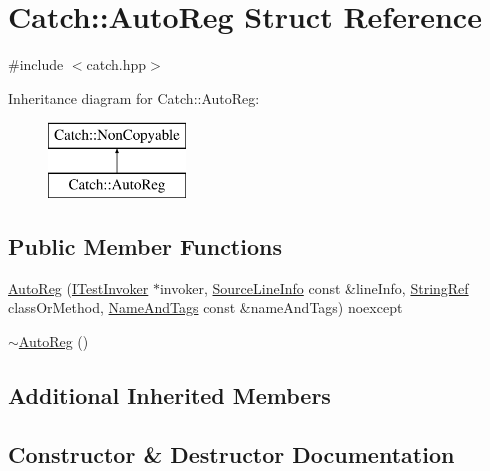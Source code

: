 \hypertarget{structCatch_1_1AutoReg}{}\section{Catch\+:\+:Auto\+Reg Struct Reference}
\label{structCatch_1_1AutoReg}


{\ttfamily \#include $<$catch.\+hpp$>$}

Inheritance diagram for Catch\+:\+:Auto\+Reg\+:\begin{figure}[H]
\begin{center}
\leavevmode
\includegraphics[height=2.000000cm]{structCatch_1_1AutoReg}
\end{center}
\end{figure}
\subsection*{Public Member Functions}
\begin{DoxyCompactItemize}
\item 
\mbox{\hyperlink{structCatch_1_1AutoReg_a67eef1fbd8f281ae09c6ccecddc34aa7}{Auto\+Reg}} (\mbox{\hyperlink{structCatch_1_1ITestInvoker}{I\+Test\+Invoker}} $\ast$invoker, \mbox{\hyperlink{structCatch_1_1SourceLineInfo}{Source\+Line\+Info}} const \&line\+Info, \mbox{\hyperlink{classCatch_1_1StringRef}{String\+Ref}} class\+Or\+Method, \mbox{\hyperlink{structCatch_1_1NameAndTags}{Name\+And\+Tags}} const \&name\+And\+Tags) noexcept
\item 
\mbox{\hyperlink{structCatch_1_1AutoReg_a3cdb53f1e5ff115310f3372bebe198f1}{$\sim$\+Auto\+Reg}} ()
\end{DoxyCompactItemize}
\subsection*{Additional Inherited Members}


\subsection{Constructor \& Destructor Documentation}
\mbox{\label{structCatch_1_1AutoReg_a67eef1fbd8f281ae09c6ccecddc34aa7}} 

